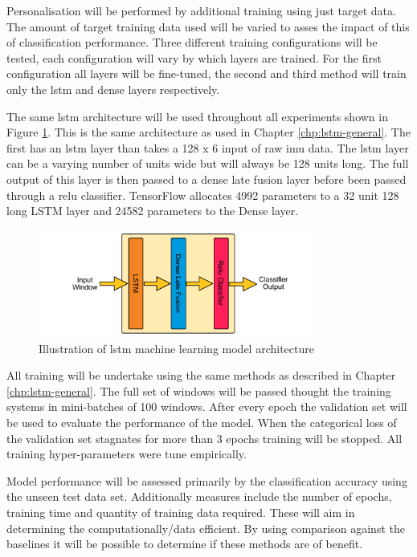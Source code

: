 Personalisation will be performed by additional training using just target data. The amount of target training data used will be varied to asses the impact of this of classification performance. Three different training configurations will be tested, each configuration will vary by which layers are trained. For the first configuration all layers will be fine-tuned, the second and third method will train only the \acrshort{lstm} and dense layers respectively.

The same \acrshort{lstm} architecture will be used throughout all experiments shown in Figure \ref{fig:ch5_illustration_of_base_LSTM_model}. This is the same architecture as used in Chapter \ref{chp:lstm-general}. The first has an \acrshort{lstm} layer than takes a 128 x 6 input of raw \acrshort{imu} data. The \acrshort{lstm} layer can be a varying number of units wide but will always be 128 units long. The full output of this layer is then passed to a dense late fusion layer before been passed through a \acrshort{relu} classifier. TensorFlow allocates 4992 parameters to a 32 unit 128 long LSTM layer and 24582 parameters to the Dense layer.

\begin{figure}[htbp]
    \centering
    \includegraphics[width=0.8\textwidth]{content/5-Personalisation/ch5_lstm_architecture.pdf}
    \caption[Illustration of  machine learning model architecture]{Illustration of \acrshort{lstm} machine learning model architecture}
    \label{fig:ch5_illustration_of_base_LSTM_model}
\end{figure}

All training will be undertake using the same methods as described in Chapter \ref{chp:lstm-general}. The full set of windows will be passed thought the training systems in mini-batches of 100 windows. After every epoch the validation set will be used to evaluate the performance of the model. When the categorical loss of the validation set stagnates for more than 3 epochs training will be stopped. All training hyper-parameters were tune empirically.

Model performance will be assessed primarily by the classification accuracy using the unseen test data set. Additionally measures include the number of epochs, training time and quantity of training data required. These will aim in determining the computationally/data efficient. By using comparison against the baselines it will be possible to determine if these methods are of benefit.


